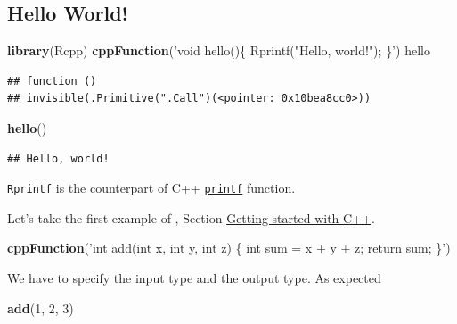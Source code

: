 \documentclass[]{book}
\newenvironment{Shaded}{\begin{snugshade}}{\end{snugshade}}
\newcommand{\KeywordTok}[1]{\textcolor[rgb]{0.13,0.29,0.53}{\textbf{#1}}}
\newcommand{\DecValTok}[1]{\textcolor[rgb]{0.00,0.00,0.81}{#1}}
\newcommand{\StringTok}[1]{\textcolor[rgb]{0.31,0.60,0.02}{#1}}
\newcommand{\NormalTok}[1]{#1}
\theoremstyle{definition}
\theoremstyle{definition}
\theoremstyle{definition}
\theoremstyle{remark}
\begin{document}
\subsection{Hello World!}\label{hello-world}

\begin{Shaded}
\begin{Highlighting}[]
\KeywordTok{library}\NormalTok{(Rcpp)}
\KeywordTok{cppFunction}\NormalTok{(}\StringTok{'void hello()\{}
\StringTok{  Rprintf("Hello, world!");}
\StringTok{\}'}\NormalTok{)}
\NormalTok{hello}
\end{Highlighting}
\end{Shaded}

\begin{verbatim}
## function () 
## invisible(.Primitive(".Call")(<pointer: 0x10bea8cc0>))
\end{verbatim}

\begin{Shaded}
\begin{Highlighting}[]
\KeywordTok{hello}\NormalTok{()}
\end{Highlighting}
\end{Shaded}

\begin{verbatim}
## Hello, world!
\end{verbatim}

\texttt{Rprintf} is the counterpart of C++
\href{http://www.cplusplus.com/reference/cstdio/printf/}{\texttt{printf}}
function.

Let's take the first example of \citet{Wickham2014}, Section
\href{http://adv-r.had.co.nz/Rcpp.html\#rcpp-intro}{Getting started with
C++}.

\begin{Shaded}
\begin{Highlighting}[]
\KeywordTok{cppFunction}\NormalTok{(}\StringTok{'int add(int x, int y, int z) \{}
\StringTok{  int sum = x + y + z;}
\StringTok{  return sum;}
\StringTok{\}'}\NormalTok{)}
\end{Highlighting}
\end{Shaded}

We have to specify the input type and the output type. As expected

\begin{Shaded}
\begin{Highlighting}[]
\KeywordTok{add}\NormalTok{(}\DecValTok{1}\NormalTok{, }\DecValTok{2}\NormalTok{, }\DecValTok{3}\NormalTok{)}
\end{Highlighting}
\end{Shaded}
\end{document}
